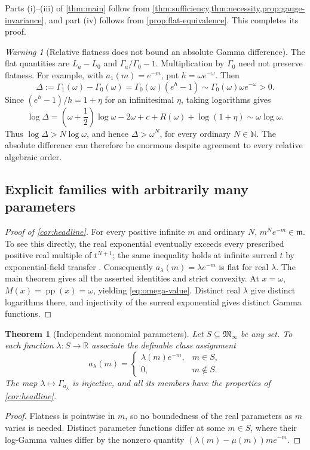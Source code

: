 \documentclass[11pt,letterpaper]{article}
\numberwithin{equation}{section}
\newtheorem{theorem}{Theorem}[section]
\theoremstyle{plain}
\theoremstyle{definition}
\theoremstyle{remark}
\newtheorem{warning}[warning]{Warning}
\newcommand{\R}{\mathbb R}
\newcommand{\N}{\mathbb N}
\newcommand{\mi}{\mathfrak m}
\newcommand{\Minf}{\mathfrak M_{\infty}}
\newcommand{\pp}{\operatorname{pp}}
\begin{document}
Parts (i)--(iii) of \cref{thm:main} follow from
\cref{thm:sufficiency,thm:necessity,prop:gauge-invariance}, and part (iv)
follows from \cref{prop:flat-equivalence}. This completes its proof.

\begin{warning}[Relative flatness does not bound an absolute Gamma difference]
\label{warn:absolute-difference}
The flat quantities are $L_a-L_0$ and $\Gamma_a/\Gamma_0-1$.
Multiplication by $\Gamma_0$ need not preserve flatness. For example, with
$a_1(m)=e^{-m}$, put $h=\omega e^{-\omega}$. Then
\[
 \Delta:=\Gamma_1(\omega)-\Gamma_0(\omega)
 =\Gamma_0(\omega)(e^h-1)
 \sim\Gamma_0(\omega)\omega e^{-\omega}>0.
\]
Since $(e^h-1)/h=1+\eta$ for an infinitesimal $\eta$, taking logarithms gives
\[
 \log\Delta
 =\left(\omega+\frac12\right)\log\omega-2\omega+c+R(\omega)
   +\log(1+\eta)
 \sim\omega\log\omega.
\]
Thus $\log\Delta>N\log\omega$, and hence $\Delta>\omega^N$, for every
ordinary $N\in\N$. The absolute difference can therefore be enormous
despite agreement to every relative algebraic order.
\end{warning}

\subsection{Explicit families with arbitrarily many parameters}
\begin{proof}[Proof of \cref{cor:headline}]
For every positive infinite $m$ and ordinary $N$,
$m^N e^{-m}\in\mi$. To see this directly, the real exponential eventually
exceeds every prescribed positive real multiple of $t^{N+1}$; the same
inequality holds at infinite surreal $t$ by exponential-field transfer
\cite{vdDE}. Consequently $a_\lambda(m)=\lambda e^{-m}$ is flat for
real $\lambda$. The main theorem gives all the asserted identities and
strict convexity. At $x=\omega$, $M(x)=\pp(x)=\omega$, yielding
\eqref{eq:omega-value}. Distinct real $\lambda$ give distinct logarithms
there, and injectivity of the surreal exponential gives distinct Gamma
functions.
\end{proof}

\begin{theorem}[Independent monomial parameters]\label{thm:independent}
Let $S\subseteq\Minf$ be any set. To each function
$\lambda:S\to\R$ associate the definable class assignment
\[
 a_\lambda(m)=
 \begin{cases}
 \lambda(m)e^{-m},&m\in S,\\
 0,&m\notin S.
 \end{cases}
\]
The map $\lambda\mapsto\Gamma_{a_\lambda}$ is injective, and all its
members have the properties of \cref{cor:headline}.
\end{theorem}
\begin{proof}
Flatness is pointwise in $m$, so no boundedness of the real parameters as
$m$ varies is needed. Distinct parameter functions differ at some $m\in S$,
where their log-Gamma values differ by the nonzero quantity
$(\lambda(m)-\mu(m))m e^{-m}$.
\end{proof}
\end{document}
